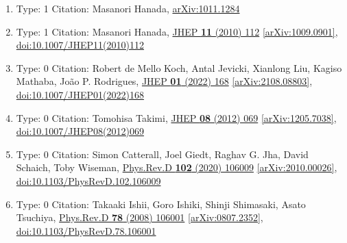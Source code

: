 \documentclass[a4paper,10pt]{article}
\begin{document}
\begin{enumerate}
\begin{enumerate}
  \item Type: 1 Citation: Masanori Hanada, \href{https://arxiv.org/abs/1011.1284}{arXiv:1011.1284}
  \item Type: 1 Citation: Masanori Hanada, \href{https://www.doi.org/10.1007/JHEP11(2010)112}{JHEP {\bf 11} (2010) 112}  \href{https://arxiv.org/abs/1009.0901}{[arXiv:1009.0901]},\\\href{https://www.doi.org/10.1007/JHEP11(2010)112}{doi:10.1007/JHEP11(2010)112}
  \item Type: 0 Citation: Robert de Mello Koch, Antal Jevicki, Xianlong Liu, Kagiso Mathaba, João P. Rodrigues, \href{https://www.doi.org/10.1007/JHEP01(2022)168}{JHEP {\bf 01} (2022) 168}  \href{https://arxiv.org/abs/2108.08803}{[arXiv:2108.08803]},\\\href{https://www.doi.org/10.1007/JHEP01(2022)168}{doi:10.1007/JHEP01(2022)168}
  \item Type: 0 Citation: Tomohisa Takimi, \href{https://www.doi.org/10.1007/JHEP08(2012)069}{JHEP {\bf 08} (2012) 069}  \href{https://arxiv.org/abs/1205.7038}{[arXiv:1205.7038]},\\\href{https://www.doi.org/10.1007/JHEP08(2012)069}{doi:10.1007/JHEP08(2012)069}
  \item Type: 0 Citation: Simon Catterall, Joel Giedt, Raghav G. Jha, David Schaich, Toby Wiseman, \href{https://www.doi.org/10.1103/PhysRevD.102.106009}{Phys.Rev.D {\bf 102} (2020) 106009}  \href{https://arxiv.org/abs/2010.00026}{[arXiv:2010.00026]},\\\href{https://www.doi.org/10.1103/PhysRevD.102.106009}{doi:10.1103/PhysRevD.102.106009}
  \item Type: 0 Citation: Takaaki Ishii, Goro Ishiki, Shinji Shimasaki, Asato Tsuchiya, \href{https://www.doi.org/10.1103/PhysRevD.78.106001}{Phys.Rev.D {\bf 78} (2008) 106001}  \href{https://arxiv.org/abs/0807.2352}{[arXiv:0807.2352]},\\\href{https://www.doi.org/10.1103/PhysRevD.78.106001}{doi:10.1103/PhysRevD.78.106001}

\end{enumerate}
\end{enumerate}
\end{document}
